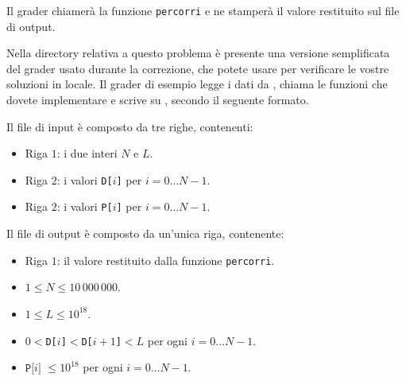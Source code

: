 \medskip

Il grader chiamerà la funzione \texttt{percorri} e ne stamperà il valore restituito sul file di output.



\Grader
Nella directory relativa a questo problema è presente una versione semplificata del grader usato durante la correzione, che potete usare per verificare le vostre soluzioni in locale. Il grader di esempio legge i dati da , chiama le funzioni che dovete implementare e scrive su \outputfile{}, secondo il seguente formato.

Il file di input è composto da tre righe, contenenti:
\begin{itemize}[nolistsep,itemsep=2mm]
\item Riga $1$: i due interi $N$ e $L$.
\item Riga $2$: i valori \texttt{D[$i$]} per $i = 0\ldots N-1$.
\item Riga $2$: i valori \texttt{P[$i$]} per $i = 0\ldots N-1$.
\end{itemize}

Il file di output è composto da un'unica riga, contenente:
\begin{itemize}[nolistsep,itemsep=2mm]
\item Riga $1$: il valore restituito dalla funzione \texttt{percorri}.
\end{itemize}



\Constraints

\begin{itemize}[nolistsep, itemsep=2mm]
	\item $1 \le N \le 10\,000\,000$.
	\item $1 \le L \le 10^{18}$.
	\item $0 < $\texttt{D[$i$]}$ < $\texttt{D[$i+1$]}$ < L$ per ogni $i=0\ldots N-1$.
	\item $\texttt{P[$i$]}$ $\le 10^{18}$ per ogni $i=0\ldots N-1$.
\end{itemize}


